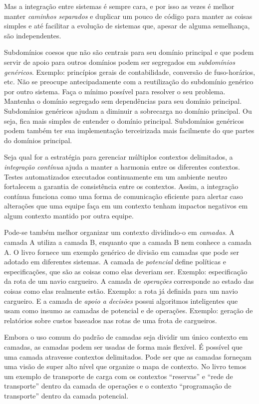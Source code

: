 \documentclass[a4paper, 12pt]{article}
\begin{document}
Mas a integração entre sistemas é sempre cara, e por isso as vezes é melhor manter \emph{caminhos separados} e duplicar um pouco de código para manter as coisas simples e até facilitar a evolução de sistemas que, apesar de alguma semelhança, são independentes.

Subdomínios coesos que não são centrais para seu domínio principal e que podem servir de apoio para outros domínios podem ser segregados em \emph{subdomínios genéricos}. Exemplo: princípios gerais de contabilidade, conversão de fuso-horários, etc. Não se preocupe antecipadamente com a reutilização do subdomínio genérico por outro sistema. Faça o mínimo possível para resolver o seu problema. Mantenha o domínio segregado sem dependências para seu domínio principal. Subdomínios genéricos ajudam a diminuir a sobrecarga no domínio principal. Ou seja, fica mais simples de entender o domínio principal. Subdomínios genéricos podem também ter sua implementação terceirizada mais facilmente do que partes do domínios principal.

Seja qual for a estratégia para gerenciar múltiplos contextos delimitados, a \emph{integração contínua} ajuda a manter a harmonia entre os diferentes contextos. Testes automatizados executados continuamente em um ambiente neutro fortalecem a garantia de consistência entre os contextos. Assim, a integração contínua funciona como uma forma de comunicação eficiente para alertar caso alterações que uma equipe faça em um contexto tenham impactos negativos em algum contexto mantido por outra equipe.

Pode-se também melhor organizar um contexto dividindo-o em \emph{camadas}. A camada A utiliza a camada B, enquanto que a camada B nem conhece a camada A. O livro fornece um exemplo genérico de divisão em camadas que pode ser adotado em diferentes sistemas. A camada de \emph{potencial} define políticas e especificações, que são as coisas como elas deveriam ser. Exemplo: especificação da rota de um navio cargueiro. A camada de \emph{operações} corresponde ao estado das coisas como elas realmente estão. Exemplo: a rota já definida para um navio cargueiro. E a camada de \emph{apoio a decisões} possui algoritmos inteligentes que usam como insumo as camadas de potencial e de operações. Exemplo: geração de relatórios sobre custos baseados nas rotas de uma frota de cargueiros.

Embora o uso comum do padrão de camadas seja dividir um único contexto em camadas, as camadas podem ser usadas de forma mais flexível. É possível que uma camada atravesse contextos delimitados. Pode ser que as camadas forneçam uma visão de super alto nível que organize o mapa de contexto. No livro temos um exemplo de transporte de carga com os contextos ``reservas'' e ``rede de transporte'' dentro da camada de operações e o contexto ``programação de transporte'' dentro da camada potencial.
\end{document}
